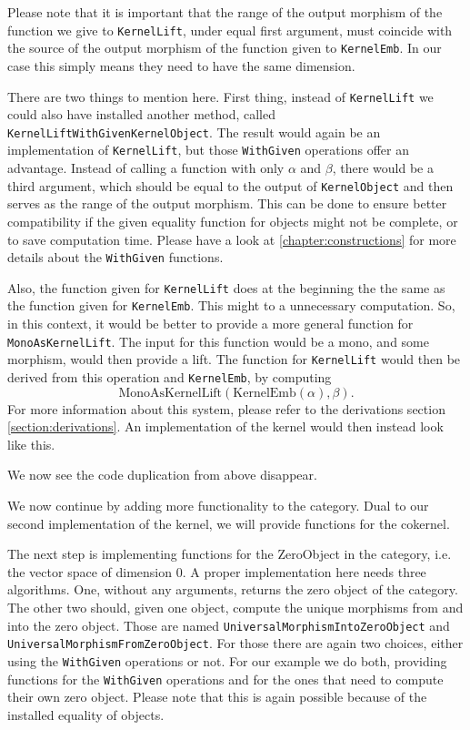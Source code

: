 Please note that it is important that the range of the output morphism of the function we give to \texttt{KernelLift},
under equal first argument, must coincide with the source of the output morphism of the function given to \texttt{KernelEmb}.
In our case this simply means they need to have the same dimension.



There are two things to mention here.
First thing, instead of \texttt{KernelLift} we could also have installed another method,
called \texttt{KernelLiftWithGivenKernelObject}. The result would again be an implementation of \texttt{KernelLift}, but those
\texttt{WithGiven} operations offer an advantage. Instead of calling a function with only $\alpha$ and $\beta$, there
would be a third argument, which should be equal to the output of \texttt{KernelObject} and then serves as the range of the output morphism.
This can be done to ensure better compatibility if the given equality function for objects might not be complete, or to save computation time.
Please have a look at \ref{chapter:constructions} for more details about the \texttt{WithGiven} functions.

Also, the function given for \texttt{KernelLift} does at the beginning the the same as the function given for \texttt{KernelEmb}. This might to
a unnecessary computation. So, in this context, it would be better to provide a more general function for \texttt{MonoAsKernelLift}.
The input for this function would be a mono, and some morphism, would then provide a lift. The function for \texttt{KernelLift} would then be derived
from this operation and \texttt{KernelEmb}, by computing
\[
 \mathrm{MonoAsKernelLift} \left( \mathrm{KernelEmb} \left( \alpha \right), \beta \right).
\]
For more information about this system, please refer to the derivations section \ref{section:derivations}.
An implementation of the kernel would then instead look like this.



We now see the code duplication from above disappear.

We now continue by adding more functionality to the category. Dual to our second implementation of the kernel,
we will provide functions for the cokernel.



The next step is implementing functions for the \textrm{ZeroObject} in the category, i.e. the vector space
of dimension 0. A proper implementation here needs three algorithms. One, without any arguments, returns the
zero object of the category. The other two should, given one object, compute the unique morphisms from and into
the zero object. Those are named \texttt{UniversalMorphismIntoZeroObject} and \texttt{UniversalMorphismFromZeroObject}.
For those there are again two choices, either using the \texttt{WithGiven} operations or not.
For our example we do both, providing functions for the \texttt{WithGiven} operations and for the ones that
need to compute their own zero object. Please note that this is again possible because of the installed equality of objects.

